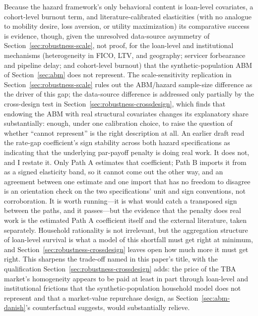\documentclass[12pt]{article}
\begin{document}
Because the hazard framework's only behavioral content is loan-level covariates, a cohort-level burnout term, and literature-calibrated elasticities (with no analogue to mobility desire, loss aversion, or utility maximization) its comparative success is evidence, though, given the unresolved data-source asymmetry of Section~\ref{sec:robustness-scale}, not proof, for the loan-level and institutional mechanisms (heterogeneity in FICO, LTV, and geography; servicer forbearance and pipeline delay; and cohort-level burnout) that the synthetic-population ABM of Section~\ref{sec:abm} does not represent. The scale-sensitivity replication in Section~\ref{sec:robustness-scale} rules out the ABM/hazard sample-size difference as the driver of this gap; the data-source difference is addressed only partially by the cross-design test in Section~\ref{sec:robustness-crossdesign}, which finds that endowing the ABM with real structural covariates changes its explanatory share substantially: enough, under one calibration choice, to raise the question of whether ``cannot represent'' is the right description at all. An earlier draft read the rate-gap coefficient's sign stability across both hazard specifications as indicating that the underlying par-payoff penalty is doing real work. It does not, and I restate it. Only Path A estimates that coefficient; Path B imports it from \citet{liebersohn2024} as a signed elasticity band, so it cannot come out the other way, and an agreement between one estimate and one import that has no freedom to disagree is an orientation check on the two specifications' unit and sign conventions, not corroboration. It is worth running---it is what would catch a transposed sign between the paths, and it passes---but the evidence that the penalty does real work is the estimated Path A coefficient itself and the external literature, taken separately. Household rationality is not irrelevant, but the aggregation structure of loan-level survival is what a model of this shortfall must get right at minimum, and Section~\ref{sec:robustness-crossdesign} leaves open how much more it must get right. This sharpens the trade-off named in this paper's title, with the qualification Section~\ref{sec:robustness-crossdesign} adds: the price of the TBA market's homogeneity appears to be paid at least in part through loan-level and institutional frictions that the synthetic-population household model does not represent and that a market-value repurchase design, as Section~\ref{sec:abm-danish}'s counterfactual suggests, would substantially relieve.
\end{document}
